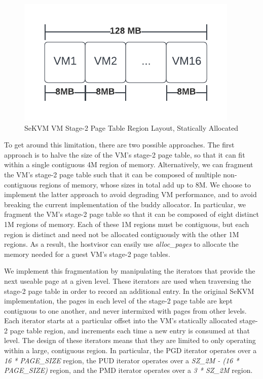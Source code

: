 \begin{figure}[h!tbp]
\caption{SeKVM VM Stage-2 Page Table Region Layout, Statically Allocated}
\label{fig:sekvmvmregions}
\centering
    \includegraphics{sekvm_vm_region}
\end{figure}

To get around this limitation, there are two possible approaches. The first approach
is to halve the size of the VM's stage-2 page table, so that it can fit within
a single contiguous 4M region of memory. Alternatively, we can fragment the VM's stage-2
page table such that it can be composed of multiple non-contiguous regions of memory, whose sizes in total add up to 8M. We
choose to implement the latter approach to avoid degrading VM performance, and to avoid
breaking the current implementation of the buddy allocator. In
particular, we fragment the VM's stage-2 page table so that it can be composed
of eight distinct 1M regions of memory. Each of these 1M regions must be contiguous,
but each region is distinct and need not be allocated contiguously with the
other 1M regions. As a result, the hostvisor can easily use \textit{alloc\_pages}
to allocate the memory needed for a guest VM's stage-2 page tables.

We implement this fragmentation by manipulating the iterators that provide the next useable
page at a given level. These iterators are used when traversing the stage-2 page table in order to record
an additional entry. In the original SeKVM implementation, the pages in each level of the stage-2 page table are
kept contiguous to one another, and never intermixed with pages from other levels.
Each iterator starts at a particular offset into the VM's statically allocated stage-2
page table region, and increments each time a new entry is consumed at that level. The design of these iterators means that they are limited to
only operating within a large, contiguous region. In particular, the PGD iterator operates over a \textit{16 * PAGE\_SIZE} region, the PUD
iterator operates over a \textit{SZ\_2M - (16 * PAGE\_SIZE)} region, and the PMD iterator operates over a \textit{3 * SZ\_2M} region.

